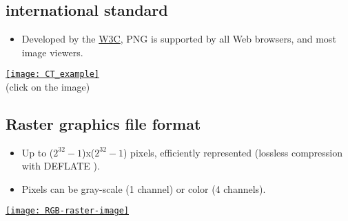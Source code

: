 \chapter{}

\section{ international standard}
\begin{itemize}
\item Developed by the \href{https://www.w3.org/}{W3C}, \gls{PNG} \cite{roelofs1999png} is
  supported by all Web browsers, and most image viewers.
\end{itemize}
\begin{center}
  \href{https://upload.wikimedia.org/wikipedia/commons/0/05/CT_of_a_normal_abdomen_and_pelvis%2C_coronal_plane_79.png}{\texttt{[image: CT\_example]}}\\
     (click on the image)
\end{center}

\section{Raster graphics file format}
\begin{itemize}
\item Up to ($2^{32}-1$)x($2^{32}-1$) pixels, efficiently represented
  (lossless compression with DEFLATE \cite{deutsch1996deflate}).
\item Pixels can be gray-scale (1 channel) or color
   (4 channels).
\end{itemize}
\vspace{-4ex}
\begin{center}
  \href{https://en.wikipedia.org/wiki/Raster_graphics}{\texttt{[image: RGB-raster-image]}}
\end{center}

